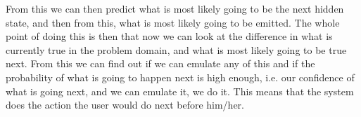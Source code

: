 From this we can then predict what is most likely going to be the next hidden state, and then from this, what is most likely going to be emitted. The whole point of doing this is then that now we can look at the difference in what is currently true in the problem domain, and what is most likely going to be true next. From this we can find out if we can emulate any of this and if the probability of what is going to happen next is high enough, i.e. our confidence of what is going next, and we can emulate it, we do it. This means that the system does the action the user would do next before him/her.
